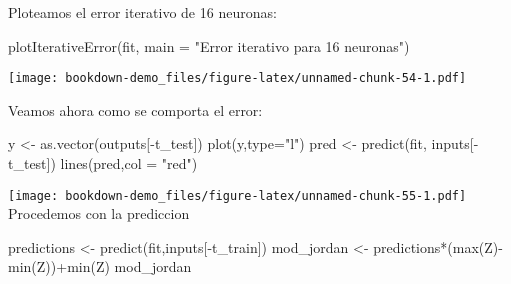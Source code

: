 \documentclass[
]{book}
\newenvironment{Shaded}{\begin{snugshade}}{\end{snugshade}}
\newcommand{\AttributeTok}[1]{\textcolor[rgb]{0.77,0.63,0.00}{#1}}
\newcommand{\FunctionTok}[1]{\textcolor[rgb]{0.00,0.00,0.00}{#1}}
\newcommand{\NormalTok}[1]{#1}
\newcommand{\OtherTok}[1]{\textcolor[rgb]{0.56,0.35,0.01}{#1}}
\newcommand{\SpecialCharTok}[1]{\textcolor[rgb]{0.00,0.00,0.00}{#1}}
\newcommand{\StringTok}[1]{\textcolor[rgb]{0.31,0.60,0.02}{#1}}
\begin{document}
Ploteamos el error iterativo de 16 neuronas:

\begin{Shaded}
\begin{Highlighting}[]
\FunctionTok{plotIterativeError}\NormalTok{(fit, }\AttributeTok{main =} \StringTok{"Error iterativo para 16 neuronas"}\NormalTok{)}
\end{Highlighting}
\end{Shaded}

\texttt{[image: bookdown-demo\_files/figure-latex/unnamed-chunk-54-1.pdf]}

Veamos ahora como se comporta el error:

\begin{Shaded}
\begin{Highlighting}[]
\NormalTok{y }\OtherTok{\textless{}{-}} \FunctionTok{as.vector}\NormalTok{(outputs[}\SpecialCharTok{{-}}\NormalTok{t\_test])}
\FunctionTok{plot}\NormalTok{(y,}\AttributeTok{type=}\StringTok{"l"}\NormalTok{)}
\NormalTok{pred }\OtherTok{\textless{}{-}} \FunctionTok{predict}\NormalTok{(fit, inputs[}\SpecialCharTok{{-}}\NormalTok{t\_test])}
\FunctionTok{lines}\NormalTok{(pred,}\AttributeTok{col =} \StringTok{"red"}\NormalTok{)}
\end{Highlighting}
\end{Shaded}

\texttt{[image: bookdown-demo\_files/figure-latex/unnamed-chunk-55-1.pdf]}
Procedemos con la prediccion

\begin{Shaded}
\begin{Highlighting}[]
\NormalTok{predictions }\OtherTok{\textless{}{-}} \FunctionTok{predict}\NormalTok{(fit,inputs[}\SpecialCharTok{{-}}\NormalTok{t\_train])}
\NormalTok{mod\_jordan }\OtherTok{\textless{}{-}}\NormalTok{ predictions}\SpecialCharTok{*}\NormalTok{(}\FunctionTok{max}\NormalTok{(Z)}\SpecialCharTok{{-}}\FunctionTok{min}\NormalTok{(Z))}\SpecialCharTok{+}\FunctionTok{min}\NormalTok{(Z)}
\NormalTok{mod\_jordan}
\end{Highlighting}
\end{Shaded}
\end{document}
